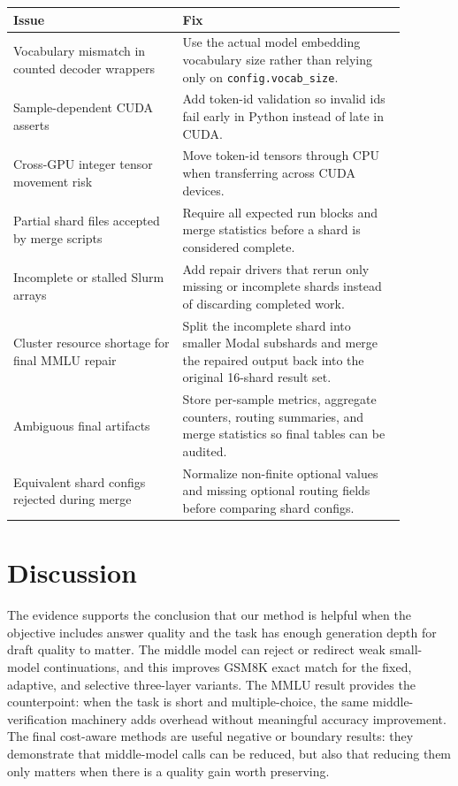 \documentclass[11pt]{article}
\begin{document}
\begin{center}
\begin{tabular}{p{0.38\linewidth}p{0.50\linewidth}}
\toprule
Issue & Fix \\
\midrule
Vocabulary mismatch in counted decoder wrappers & Use the actual model embedding vocabulary size rather than relying only on \texttt{config.vocab\_size}. \\
Sample-dependent CUDA asserts & Add token-id validation so invalid ids fail early in Python instead of late in CUDA. \\
Cross-GPU integer tensor movement risk & Move token-id tensors through CPU when transferring across CUDA devices. \\
Partial shard files accepted by merge scripts & Require all expected run blocks and merge statistics before a shard is considered complete. \\
Incomplete or stalled Slurm arrays & Add repair drivers that rerun only missing or incomplete shards instead of discarding completed work. \\
Cluster resource shortage for final MMLU repair & Split the incomplete shard into smaller Modal subshards and merge the repaired output back into the original 16-shard result set. \\
Ambiguous final artifacts & Store per-sample metrics, aggregate counters, routing summaries, and merge statistics so final tables can be audited. \\
Equivalent shard configs rejected during merge & Normalize non-finite optional values and missing optional routing fields before comparing shard configs. \\
\bottomrule
\end{tabular}
\end{center}

\section{Discussion}

The evidence supports the conclusion that our method is helpful when the objective includes answer quality and the task has enough generation depth for draft quality to matter. The middle model can reject or redirect weak small-model continuations, and this improves GSM8K exact match for the fixed, adaptive, and selective three-layer variants. The MMLU result provides the counterpoint: when the task is short and multiple-choice, the same middle-verification machinery adds overhead without meaningful accuracy improvement. The final cost-aware methods are useful negative or boundary results: they demonstrate that middle-model calls can be reduced, but also that reducing them only matters when there is a quality gain worth preserving.
\end{document}
